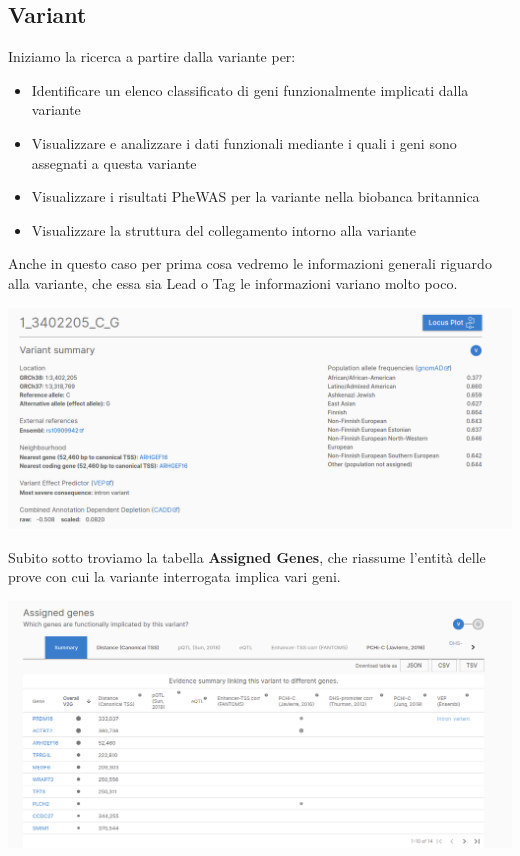 \documentclass{article}
\begin{document}
\subsection{Variant}
\begin{box4}
    [title={\textbf{Ricerca per Variante}}]
    {Iniziamo la ricerca a partire dalla variante per:
    \begin{itemize}
        \item Identificare un elenco classificato di geni funzionalmente implicati dalla variante
        \item Visualizzare e analizzare i dati funzionali mediante i quali i geni sono assegnati a questa variante
        \item Visualizzare i risultati PheWAS per la variante nella biobanca britannica
        \item Visualizzare la struttura del collegamento intorno alla variante
    \end{itemize}}
\end{box4}
Anche in questo caso per prima cosa vedremo le informazioni generali riguardo alla variante, che essa sia Lead o Tag le informazioni variano molto poco.
\begin{center}
    \includegraphics[width=1\textwidth]{figures/9-Variante.png}
\end{center}
Subito sotto troviamo la tabella \textbf{Assigned Genes}, che riassume l'entità delle prove con cui la variante interrogata implica vari geni. 
\begin{center}
    \includegraphics[width=1\textwidth]{figures/10-Variante.png}
\end{center}
\end{document}
